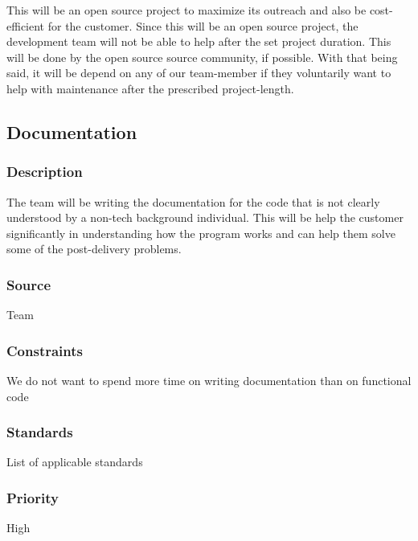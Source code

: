 This will be an open source project to maximize its outreach and also be cost-efficient for the customer. Since this will be an open source project, the development team will not be able to help after the set project duration. This will be done by the open source source community, if possible. With that being said, it will be depend on any of our team-member if they voluntarily want to help with maintenance after the prescribed project-length.

\subsection{Documentation}
\subsubsection{Description}
The team will be writing the documentation for the code that is not clearly understood by a non-tech background individual. This will be help the customer significantly in understanding how the program works and can help them solve some of the post-delivery problems.
\subsubsection{Source}
Team
\subsubsection{Constraints}
We do not want to spend more time on writing documentation than on functional code 
\subsubsection{Standards}
List of applicable standards
\subsubsection{Priority}
High